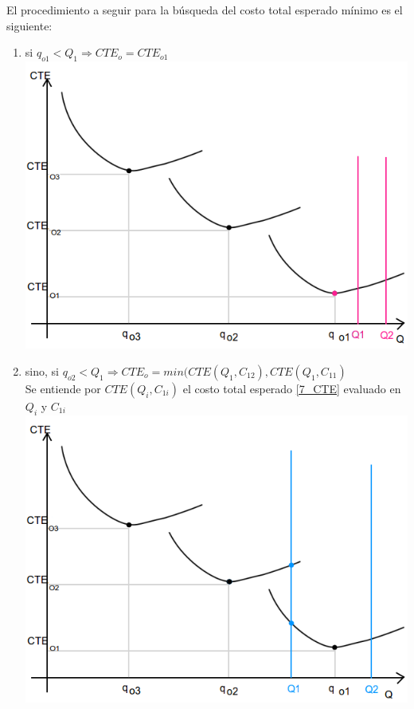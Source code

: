 \documentclass{article}
\begin{document}
El procedimiento a seguir para la búsqueda del costo total esperado mínimo es el siguiente: 
\begin{enumerate}
 \item si $q_{o1} < Q_1 \Rightarrow CTE_o = CTE_{o1}$ \\
      \includegraphics[scale=0.5,keepaspectratio=true]{img/7/7_QvsCTE_1.png} 
 \item sino, si $ q_{o2} < Q_1 \Rightarrow CTE_o = min( CTE(Q_1, C_{12}), CTE(Q_1, C_{11})$ \\
       Se entiende por $CTE(Q_i, C_{1i})$ el costo total esperado \eqref{7_CTE} evaluado en $Q_i$ y $C_{1i}$ \\
      \includegraphics[scale=0.5,keepaspectratio=true]{img/7/7_QvsCTE_2.png} 

\end{enumerate}
\end{document}
